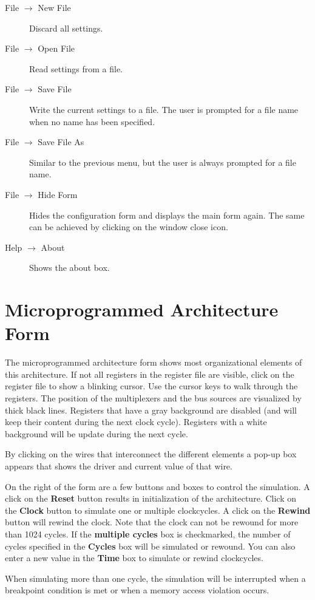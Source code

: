 \documentclass{article}
\begin{document}
\begin{description}
\item[File $\to$ New File] Discard all settings.
\item[File $\to$ Open File] Read settings from a file.
\item[File $\to$ Save File] Write the current settings to a file. The user is prompted for a file name when no name has been specified.
\item[File $\to$ Save File As]Similar to the previous menu, but the user is always prompted for a file name.
\item[File $\to$ Hide Form] Hides the configuration form and displays the main form again. The same can be achieved by clicking on the window close icon.
\item[Help $\to$ About]Shows the about box.
\end{description}

\section{Microprogrammed Architecture Form}
The microprogrammed architecture form shows most organizational elements of this architecture. If not all registers in
the register file are visible, click on the register file to show a blinking cursor. Use the cursor keys to walk through
the registers. The position of the multiplexers and the bus sources are visualized by thick black lines. Registers that
have a gray background are disabled (and will keep their content during the next clock cycle). Registers with a white
background will be update during the next cycle.

By clicking on the wires that interconnect the different elements a 
pop-up box appears that shows the driver and current value of that wire.

On the right of the form are a few buttons and boxes to control the simulation. A click on the \textbf{Reset} button
results in initialization of the architecture. Click on the \textbf{Clock} button to simulate one or multiple
clockcycles. A click on the \textbf{Rewind} button will rewind the clock. Note that the clock can not be rewound for more
than 1024 cycles. If the \textbf{multiple cycles} box is checkmarked, the number of cycles specified in the \textbf{Cycles}
box will be simulated or rewound. You can also enter a new value in the \textbf{Time} box to simulate or rewind
clockcycles.

When simulating more than one cycle, the simulation will be interrupted when a breakpoint condition is met or when a
memory access violation occurs.
\end{document}
